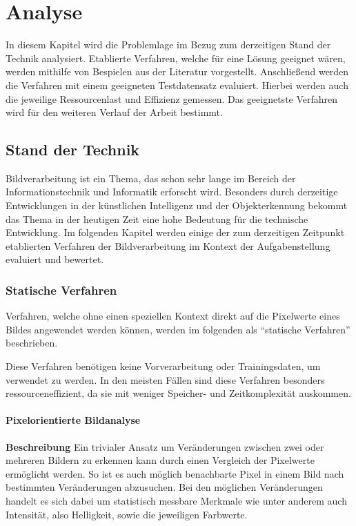 \chapter{Analyse}
In diesem Kapitel wird die Problemlage im Bezug zum derzeitigen Stand der Technik analysiert.
Etablierte Verfahren, welche für eine Lösung geeignet wären, werden mithilfe von Bespielen aus der Literatur vorgestellt.
Anschließend werden die Verfahren mit einem geeigneten Testdatensatz evaluiert.
Hierbei werden auch die jeweilige Ressourcenlast und Effizienz gemessen.
Das geeignetste Verfahren wird für den weiteren Verlauf der Arbeit bestimmt.

\section{Stand der Technik}
Bildverarbeitung ist ein Thema, das schon sehr lange im Bereich der Informationstechnik und Informatik erforscht wird.
Besonders durch derzeitige Entwicklungen in der künstlichen Intelligenz und der Objekterkennung bekommt das Thema in der heutigen Zeit eine hohe Bedeutung für die technische Entwicklung. Im folgenden Kapitel werden einige der zum derzeitigen Zeitpunkt etablierten Verfahren der Bildverarbeitung im Kontext der Aufgabenstellung evaluiert und bewertet.

\subsection{Statische Verfahren}
Verfahren, welche ohne einen speziellen Kontext direkt auf die Pixelwerte eines Bildes angewendet werden können, werden im folgenden als "`statische Verfahren"' beschrieben. 

Diese Verfahren benötigen keine Vorverarbeitung oder Trainingsdaten, um verwendet zu werden.
In den meisten Fällen sind diese Verfahren besonders ressourceneffizient, da sie mit weniger Speicher- und Zeitkomplexität auskommen.
\subsubsection{Pixelorientierte Bildanalyse}
\textbf{Beschreibung}\newline
Ein trivialer Ansatz um Veränderungen zwischen zwei oder mehreren Bildern zu erkennen kann durch einen Vergleich der Pixelwerte ermöglicht werden.
So ist es auch möglich benachbarte Pixel in einem Bild nach bestimmten Veränderungen abzusuchen.
Bei den möglichen Veränderungen handelt es sich dabei um statistisch messbare Merkmale wie unter anderem auch Intensität, also Helligkeit, sowie die jeweiligen Farbwerte.


